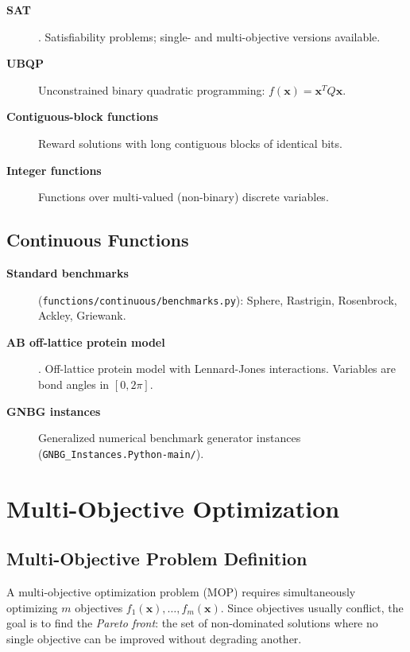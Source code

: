 \documentclass[a4paper,11pt]{article}
\begin{document}
\begin{description}
  \item[\textbf{SAT}] \citep{Selman_et_al:1992}.
    Satisfiability problems; single- and multi-objective versions available.

  \item[\textbf{UBQP}]
    Unconstrained binary quadratic programming:
    $f(\mathbf{x}) = \mathbf{x}^T Q \mathbf{x}$.

  \item[\textbf{Contiguous-block functions}]
    Reward solutions with long contiguous blocks of identical bits.

  \item[\textbf{Integer functions}]
    Functions over multi-valued (non-binary) discrete variables.
\end{description}

\subsection{Continuous Functions}

\begin{description}
  \item[\textbf{Standard benchmarks}] (\texttt{functions/continuous/benchmarks.py}):
    Sphere, Rastrigin, Rosenbrock, Ackley, Griewank.

  \item[\textbf{AB off-lattice protein model}] \citep{Larranhaga_et_al:1999}.
    Off-lattice protein model with Lennard-Jones interactions.
    Variables are bond angles in $[0, 2\pi]$.

  \item[\textbf{GNBG instances}]
    Generalized numerical benchmark generator instances
    (\texttt{GNBG\_Instances.Python-main/}).
\end{description}

\section{Multi-Objective Optimization}
\label{sec:multiobjective}

\subsection{Multi-Objective Problem Definition}

A multi-objective optimization problem (MOP) \citep{Deb:2001} requires
simultaneously optimizing $m$ objectives $f_1(\mathbf{x}), \ldots, f_m(\mathbf{x})$.
Since objectives usually conflict, the goal is to find the \emph{Pareto front}:
the set of non-dominated solutions where no single objective can be improved
without degrading another.
\end{document}

